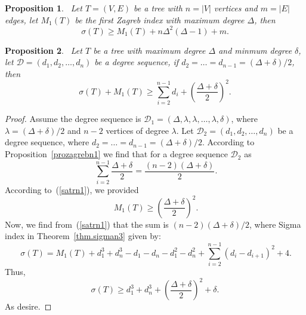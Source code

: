 \documentclass[12pt]{amsart}
\newtheorem{proposition}{Proposition}[section]
\begin{document}
\begin{proposition}~\label{prozagnsigman1}
Let $T=(V,E)$ be a tree with $n=|V|$ vertices and $m=|E|$ edges, let $M_1(T)$ be the first Zagreb index with maximum degree $\Delta$, then
\[
\sigma(T)\geq M_1(T)+n\Delta^2(\Delta-1)+m.
\]
\end{proposition}

\begin{proposition}~\label{prozagrebn2}
Let $T$ be a tree with maximum degree $\Delta$ and minmum degree $\delta$, let $\mathscr{D}=(d_1,d_2,\dots,d_n)$ be a degree sequence, if $d_2=\dots=d_{n-1}=(\Delta+\delta)/2$, then
\[
\sigma(T)+ M_1(T) \geqslant \sum_{i=2}^{n-1} d_i+\left(\frac{\Delta + \delta}{2}\right)^2.
\]
\end{proposition}
\begin{proof}
Assume the degree sequence is $\mathscr{D}_1=(\Delta, \lambda, \lambda, \dots, \lambda, \delta)$, where $\lambda=(\Delta+\delta)/2$  and $n-2$ vertices of degree $\lambda$. Let $\mathscr{D}_2=(d_1,d_2,\dots,d_n)$ be a degree sequence, where $d_2=\dots=d_{n-1}=(\Delta+\delta)/2$. According to Proposition~\ref{prozagrebn1} we find that for a degree sequence $\mathscr{D}_2$ as 
\begin{equation}~\label{satrn001}
\sum_{i=2}^{n-1} \frac{\Delta + \delta}{2} = \frac{(n-2)(\Delta + \delta)}{2}.
\end{equation}
According to~(\ref{satrn1}), we provided 
\begin{equation}~\label{resalbn3}
M_1(T) \geqslant \left(\frac{\Delta + \delta}{2}\right)^2.
\end{equation}
Now, we find from~(\ref{satrn1}) that the sum is $(n-2)(\Delta+\delta)/2$, where Sigma index in Theorem~\ref{thm.sigman3} given by: 
\begin{equation}~\label{eqqsigpron1}
    \sigma(T)=M_1(T)+d_1^3 + d_n^3 - d_1 - d_n - d_1^2 - d_n^2 + \sum_{i=2}^{n-1} (d_i - d_{i+1})^2 + 4.
\end{equation}
Thus, 
\[
\sigma(T)\geq d_1^3 + d_n^3+ \left(\frac{\Delta + \delta}{2}\right)^2 + \delta.
\]
As desire.
\end{proof}
\end{document}
